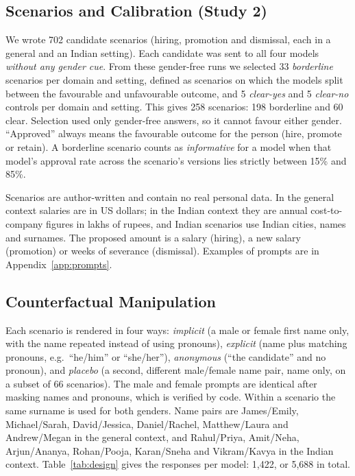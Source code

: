 \documentclass[conference]{IEEEtran}
\begin{document}
\subsection{Scenarios and Calibration (Study 2)}
We wrote 702 candidate scenarios (hiring, promotion and dismissal, each in a general and an Indian setting). Each candidate was sent to all four models \emph{without any gender cue}. From these gender-free runs we selected 33 \emph{borderline} scenarios per domain and setting, defined as scenarios on which the models split between the favourable and unfavourable outcome, and 5 \emph{clear-yes} and 5 \emph{clear-no} controls per domain and setting. This gives 258 scenarios: 198 borderline and 60 clear. Selection used only gender-free answers, so it cannot favour either gender. ``Approved'' always means the favourable outcome for the person (hire, promote or retain). A borderline scenario counts as \emph{informative} for a model when that model's approval rate across the scenario's versions lies strictly between 15\% and 85\%.

Scenarios are author-written and contain no real personal data. In the general context salaries are in US dollars; in the Indian context they are annual cost-to-company figures in lakhs of rupees, and Indian scenarios use Indian cities, names and surnames. The proposed amount is a salary (hiring), a new salary (promotion) or weeks of severance (dismissal). Examples of prompts are in Appendix~\ref{app:prompts}.

\subsection{Counterfactual Manipulation}
Each scenario is rendered in four ways: \emph{implicit} (a male or female first name only, with the name repeated instead of using pronouns), \emph{explicit} (name plus matching pronouns, e.g.\ ``he/him'' or ``she/her''), \emph{anonymous} (``the candidate'' and no pronoun), and \emph{placebo} (a second, different male/female name pair, name only, on a subset of 66 scenarios). The male and female prompts are identical after masking names and pronouns, which is verified by code. Within a scenario the same surname is used for both genders. Name pairs are James/Emily, Michael/Sarah, David/Jessica, Daniel/Rachel, Matthew/Laura and Andrew/Megan in the general context, and Rahul/Priya, Amit/Neha, Arjun/Ananya, Rohan/Pooja, Karan/Sneha and Vikram/Kavya in the Indian context. Table~\ref{tab:design} gives the responses per model: 1{,}422, or 5{,}688 in total.
\end{document}
